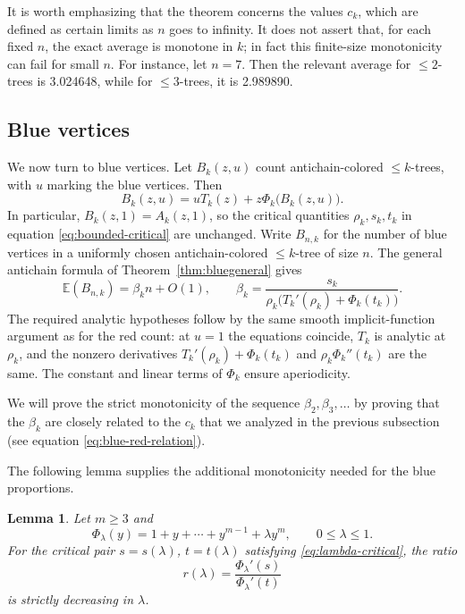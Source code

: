 \documentclass[11pt, onesided]{amsart}
\newtheorem{lemma}[theorem]{Lemma}
\theoremstyle{remark}
\begin{document}
It is worth emphasizing that the theorem concerns the values $c_k$, which are defined as certain
limits as $n$ goes to infinity.   It does not assert that, for each fixed $n$, the exact average is monotone in $k$; in fact this finite-size monotonicity can fail for small $n$. For instance, let $n=7$. 
Then the relevant average for $\leq 2$-trees is 3.024648, while for $\leq 3$-trees, it is 2.989890.

\subsection{Blue vertices}
We now turn to blue vertices. Let $B_k(z,u)$ count antichain-colored
$\leq k$-trees, with $u$ marking the blue vertices. Then
\[
B_k(z,u)=uT_k(z)+z\Phi_k\bigl(B_k(z,u)\bigr).
\]
In particular, $B_k(z,1)=A_k(z,1)$, so the critical quantities
$\rho_k,s_k,t_k$ in equation \eqref{eq:bounded-critical} are unchanged.
Write $B_{n,k}$ for the number of blue vertices in a uniformly chosen
antichain-colored $\leq k$-tree of size $n$. The general antichain formula
of Theorem~\ref{thm:bluegeneral} gives
\begin{equation} \label{blueformula}
\mathbb E(B_{n,k})=\beta_k n+O(1),
\qquad
\beta_k=\frac{s_k}{\rho_k\bigl(T_k'(\rho_k)+\Phi_k(t_k)\bigr)}.
\end{equation}
The required analytic hypotheses follow by the same smooth
implicit-function argument as for the red count: at $u=1$ the equations
coincide, $T_k$ is analytic at $\rho_k$, and the nonzero derivatives
$T_k'(\rho_k)+\Phi_k(t_k)$ and $\rho_k\Phi_k''(t_k)$ are the same.
The constant and linear terms of $\Phi_k$ ensure aperiodicity.

We will prove the strict monotonicity of the sequence $\beta_2, \beta_3,\ldots $ by proving that the
$\beta_k$ are closely related to the $c_k$ that we analyzed in the previous subsection (see equation
\eqref{eq:blue-red-relation}).

The following lemma supplies the additional monotonicity needed for the
blue proportions.

\begin{lemma}\label{lem:blue-ratio}
Let $m\geq3$ and
\[
\Phi_\lambda(y)=1+y+\cdots+y^{m-1}+\lambda y^m,
\qquad 0\leq\lambda\leq1.
\]
For the critical pair $s=s(\lambda)$, $t=t(\lambda)$ satisfying
\eqref{eq:lambda-critical}, the ratio
\[
r(\lambda)=\frac{\Phi_\lambda'(s)}{\Phi_\lambda'(t)}
\]
is strictly decreasing in $\lambda$.
\end{lemma}
\end{document}
